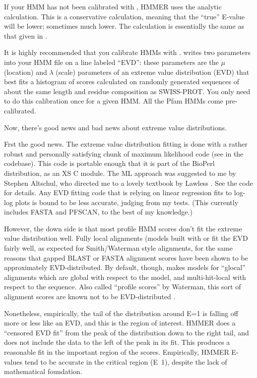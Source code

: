 \begin{itemize}
If your HMM has not been calibrated with , HMMER
uses the analytic calculation. This is a conservative calculation,
meaning that the ``true'' E-value will be lower; sometimes much lower.
The calculation is essentially the same as that given in
\cite{Barrett97}.

It is highly recommended that you calibrate HMMs with
.  writes two parameters
into your HMM file on a line labeled ``EVD'': these parameters are the
$\mu$ (location) and $\lambda$ (scale) parameters of an extreme value
distribution (EVD) that best fits a histogram of scores calculated on
randomly generated sequences of about the same length and residue
composition as SWISS-PROT. You only need to do this calibration once
for a given HMM. All the Pfam HMMs come pre-calibrated.

Now, there's good news and bad news about extreme value distributions.

Frst the good news. The extreme value distribution fitting is done
with a rather robust and personally satisfying chunk of maximum
likelihood code (see  in the codebase). This code is
portable enough that it is part of the BioPerl distribution, as an XS
C module. The ML approach was suggested to me by Stephen Altschul, who
directed me to a lovely textbook by Lawless \cite{Lawless82}. See the
code for details. Any EVD fitting code that is relying on linear
regression fits to log-log plots is bound to be less accurate, judging
from my tests. (This currently includes FASTA and PFSCAN, to the best
of my knowledge.)

However, the down side is that most profile HMM scores don't fit the
extreme value distribution well. Fully local alignments (models built
with  or  fit the EVD fairly well,
as expected for Smith/Waterman style alignments, for the same reasons
that gapped BLAST or FASTA alignment scores have been shown to be
approximately EVD-distributed. By default, though, 
makes models for ``glocal'' alignments which are global with respect
to the model, and multi-hit-local with respect to the sequence.  Also
called ``profile scores'' by Waterman, this sort of alignment scores
are known not to be EVD-distributed \cite{GoldsteinWaterman94}.

Nonetheless, empirically, the tail of the distribution around E=1 is
falling off more or less like an EVD, and this is the region of
interest. HMMER does a ``censored EVD fit'' from the peak of the
distribution down to the right tail, and does not include the data to
the left of the peak in its fit. This produces a reasonable fit in the
important region of the scores. Empirically, HMMER E-values tend to be
accurate in the critical region (E~1), despite the lack of
mathematical foundation.


\end{itemize}
